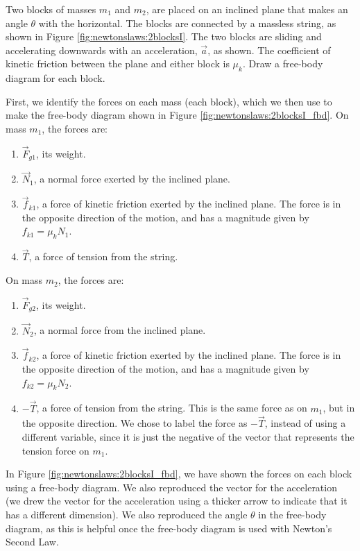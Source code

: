 \begin{example}{ Two blocks of masses $m_1$ and $m_2$, are placed on an inclined plane that makes an angle $\theta$ with the horizontal. The blocks are connected by a massless string, as shown in Figure \ref{fig:newtonslaws:2blocksI}. The two blocks are sliding and accelerating downwards with an acceleration, $\vec a$, as shown. The coefficient of kinetic friction between the plane and either block is $\mu_k$. Draw a free-body diagram for each block.}
\label{ex:newtonslaws:2blocksI}

First, we identify the forces on each mass (each block), which we then use to make the free-body diagram shown in Figure \ref{fig:newtonslaws:2blocksI_fbd}. On mass $m_1$, the forces are:

\begin{enumerate}
\item $\vec F_{g1}$, its weight.
\item $\vec N_1$, a normal force exerted by the inclined plane.
\item $\vec f_{k1}$, a force of kinetic friction exerted by the inclined plane. The force is in the opposite direction of the motion, and has a magnitude given by $f_{k1}=\mu_kN_1$.
\item $\vec T$, a force of tension from the string. 
\end{enumerate}

On mass $m_2$, the forces are:

\begin{enumerate}
\item $\vec F_{g2}$, its weight.
\item $\vec N_2$, a normal force from the inclined plane.
\item $\vec f_{k2}$, a force of kinetic friction exerted by the inclined plane. The force is in the opposite direction of the motion, and has a magnitude given by $f_{k2}=\mu_kN_2$.
\item $-\vec T$, a force of tension from the string. This is the same force as on $m_1$, but in the opposite direction. We chose to label the force as $-\vec T$, instead of using a different variable, since it is just the negative of the vector that represents the tension force on $m_1$. 
\end{enumerate}

In Figure \ref{fig:newtonslaws:2blocksI_fbd}, we have shown the forces on each block using a free-body diagram. We also reproduced the vector for the acceleration (we drew the vector for the acceleration using a thicker arrow to indicate that it has a different dimension). We also reproduced the angle $\theta$ in the free-body diagram, as this is helpful once the free-body diagram is used with Newton's Second Law.

\end{example}

